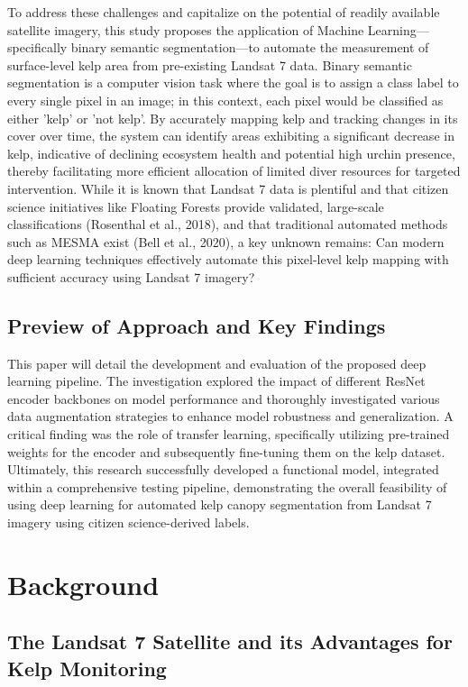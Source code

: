 \documentclass{article}
\begin{document}
To address these challenges and capitalize on the potential of readily available satellite imagery, this study proposes the application of Machine Learning—specifically binary semantic segmentation—to automate the measurement of surface-level kelp area from pre-existing Landsat 7 data. Binary semantic segmentation is a computer vision task where the goal is to assign a class label to every single pixel in an image; in this context, each pixel would be classified as either 'kelp' or 'not kelp'. By accurately mapping kelp and tracking changes in its cover over time, the system can identify areas exhibiting a significant decrease in kelp, indicative of declining ecosystem health and potential high urchin presence, thereby facilitating more efficient allocation of limited diver resources for targeted intervention. While it is known that Landsat 7 data is plentiful and that citizen science initiatives like Floating Forests provide validated, large-scale classifications (Rosenthal et al., 2018), and that traditional automated methods such as MESMA exist (Bell et al., 2020), a key unknown remains: Can modern deep learning techniques effectively automate this pixel-level kelp mapping with sufficient accuracy using Landsat 7 imagery? 


\subsection{Preview of Approach and Key Findings} 

This paper will detail the development and evaluation of the proposed deep learning pipeline. The investigation explored the impact of different ResNet encoder backbones on model performance and thoroughly investigated various data augmentation strategies to enhance model robustness and generalization. A critical finding was the role of transfer learning, specifically utilizing pre-trained weights for the encoder and subsequently fine-tuning them on the kelp dataset. Ultimately, this research successfully developed a functional model, integrated within a comprehensive testing pipeline, demonstrating the overall feasibility of using deep learning for automated kelp canopy segmentation from Landsat 7 imagery using citizen science-derived labels.

\section{Background}

\subsection{The Landsat 7 Satellite and its Advantages for Kelp Monitoring} 
\end{document}
